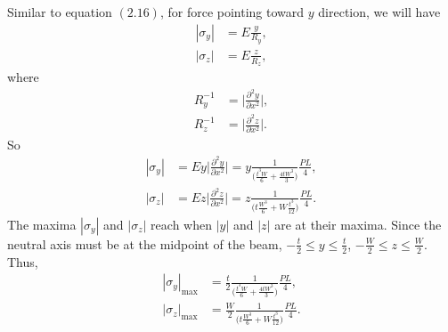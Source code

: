 \documentclass[12pt]{article}
\begin{document}
\begin{enumerate}[(a)]
	      Similar to equation $(2.16)$, for force pointing toward $y$ direction, we will have
	      \begin{align}
		      | \sigma_y | & = E \frac{ y }{ R_y }, \\
		      | \sigma_z | & = E \frac{ z }{ R_z },
	      \end{align}
	      where
	      \begin{align}
		      R_y^{-1} & = \bigg| \frac{ \partial^2 y }{ \partial x^2 } \bigg|, \\
		      R_z^{-1} & = \bigg| \frac{ \partial^2 z }{ \partial  x^2} \bigg|.
	      \end{align}
	      So
	      \begin{align}
		      | \sigma_y | & = E y \bigg| \frac{ \partial^2 y }{ \partial x^2 } \bigg| = y \frac{ 1 }{ \big( \frac{t^3 W}{6} + \frac{4 t W^3}{3} \big)} \frac{ P L }{ 4 },        \\
		      | \sigma_z | & = E z \bigg| \frac{ \partial^2 z }{ \partial  x^2} \bigg| = z \frac{ 1 }{ \big( t \frac{ W^3 }{ 6 } + W \frac{ t^3 }{ 12 } \big)} \frac{ P L }{ 4 }.
	      \end{align}
	      The maxima $|\sigma_y|$ and $|\sigma_z|$ reach when $|y|$ and $|z|$ are at their maxima.
	      Since the neutral axis must be at the midpoint of the beam,
	      $-\frac{ t }{ 2 } \le y \le \frac{ t }{ 2 }$, $-\frac{ W }{ 2 } \le z \le \frac{ W }{ 2 }$. Thus,
	      \begin{align}
		      | \sigma_y |_\text{max} & = \frac{ t }{ 2 } \frac{ 1 }{ \big( \frac{t^3 W}{6} + \frac{4 t W^3}{3} \big)} \frac{ P L }{ 4 },        \\
		      | \sigma_z |_\text{max} & = \frac{ W }{ 2 } \frac{ 1 }{ \big( t \frac{ W^3 }{ 6 } + W \frac{ t^3 }{ 12 } \big)} \frac{ P L }{ 4 }.
	      \end{align}
\end{enumerate}

% 
% 

\end{document}
